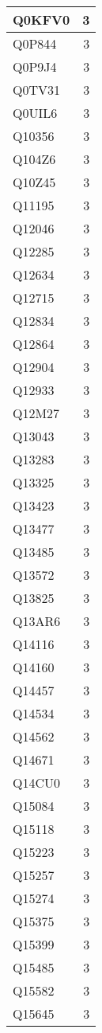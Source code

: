 \documentclass[
]{book}
\theoremstyle{definition}
\theoremstyle{definition}
\theoremstyle{definition}
\theoremstyle{definition}
\theoremstyle{remark}
\begin{document}
\begin{table}
\begin{tabular}{l|r}
\hline
Q0KFV0 & 3\\
\hline
Q0P844 & 3\\
\hline
Q0P9J4 & 3\\
\hline
Q0TV31 & 3\\
\hline
Q0UIL6 & 3\\
\hline
Q10356 & 3\\
\hline
Q104Z6 & 3\\
\hline
Q10Z45 & 3\\
\hline
Q11195 & 3\\
\hline
Q12046 & 3\\
\hline
Q12285 & 3\\
\hline
Q12634 & 3\\
\hline
Q12715 & 3\\
\hline
Q12834 & 3\\
\hline
Q12864 & 3\\
\hline
Q12904 & 3\\
\hline
Q12933 & 3\\
\hline
Q12M27 & 3\\
\hline
Q13043 & 3\\
\hline
Q13283 & 3\\
\hline
Q13325 & 3\\
\hline
Q13423 & 3\\
\hline
Q13477 & 3\\
\hline
Q13485 & 3\\
\hline
Q13572 & 3\\
\hline
Q13825 & 3\\
\hline
Q13AR6 & 3\\
\hline
Q14116 & 3\\
\hline
Q14160 & 3\\
\hline
Q14457 & 3\\
\hline
Q14534 & 3\\
\hline
Q14562 & 3\\
\hline
Q14671 & 3\\
\hline
Q14CU0 & 3\\
\hline
Q15084 & 3\\
\hline
Q15118 & 3\\
\hline
Q15223 & 3\\
\hline
Q15257 & 3\\
\hline
Q15274 & 3\\
\hline
Q15375 & 3\\
\hline
Q15399 & 3\\
\hline
Q15485 & 3\\
\hline
Q15582 & 3\\
\hline
Q15645 & 3\\

\end{tabular}
\end{table}
\end{document}
